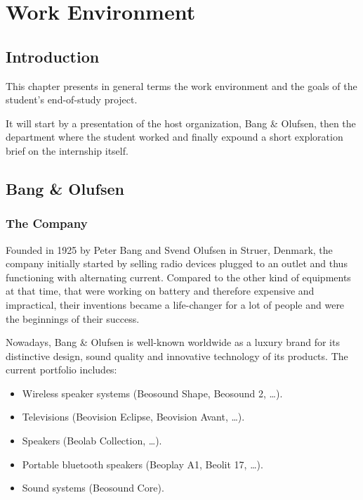 
\chapter{Work Environment} %

\label{Chapter2} %



\section*{Introduction}

This chapter presents in general terms the work environment and the goals of the student's end-of-study project.

It will start by a presentation of the host organization, Bang \& Olufsen, then the department where the student worked and finally expound a short exploration brief on the internship itself.   


\section{Bang \& Olufsen}

\subsection{The Company}

Founded in 1925 by Peter Bang and Svend Olufsen in Struer, Denmark, the company initially started by selling radio devices plugged to an outlet and thus functioning with alternating current. Compared to the other kind of equipments at that time, that were working on battery and therefore expensive and impractical, their inventions became a life-changer for a lot of people and were the beginnings of their success. 

Nowadays, Bang \& Olufsen is well-known worldwide as a luxury brand for its distinctive design, sound quality and innovative technology of its products. The current portfolio includes:
\begin{itemize}
	\item Wireless speaker systems (Beosound Shape, Beosound 2, \dots).
	\item Televisions (Beovision Eclipse, Beovision Avant, \dots).
	\item Speakers (Beolab Collection, \dots).
	\item Portable bluetooth speakers (Beoplay A1, Beolit 17, \dots).
	\item Sound systems (Beosound Core).
\end{itemize}

